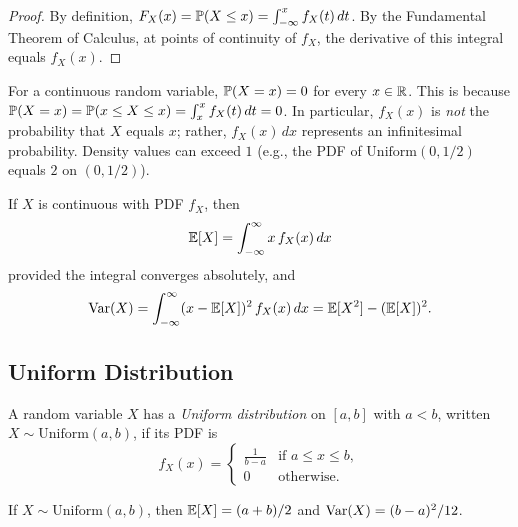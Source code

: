 \documentclass[11pt,a4paper]{article}
\begin{document}
\begin{proof}
By definition,
$F_X(x) = \mathbb{P}(X \leq x) = \int_{-\infty}^x f_X(t) \, dt$.
By the Fundamental Theorem of Calculus, at points of continuity of $f_X$,
the derivative of this integral equals $f_X(x)$.
\end{proof}

\begin{warning}[title={$\Prob(X = x) = 0$ for Continuous Random Variables}]
For a continuous random variable, $\Prob(X = x) = 0$ for every
$x \in \mathbb{R}$. This is because
$\mathbb{P}(X = x) = \mathbb{P}(x \leq X \leq x) = \int_x^x f_X(t)\,dt = 0$.
In particular, $f_X(x)$ is \emph{not} the probability that $X$ equals
$x$; rather, $f_X(x)\,dx$ represents an infinitesimal probability.
Density values can exceed $1$ (e.g., the PDF of
$\mathrm{Uniform}(0, 1/2)$ equals $2$ on $(0, 1/2)$).
\end{warning}

\begin{definition}
\label{def:continuous_expectation}
If $X$ is continuous with PDF $f_X$, then
\[
    \mathbb{E}[X] = \int_{-\infty}^{\infty} x \, f_X(x) \, dx
\]
provided the integral converges absolutely, and
\[
    \operatorname{Var}(X) = \int_{-\infty}^{\infty} (x - \mathbb{E}[X])^2 \, f_X(x) \, dx
    = \mathbb{E}[X^2] - (\mathbb{E}[X])^2.
\]
\end{definition}

\subsection{Uniform Distribution}

\begin{definition}
\label{def:uniform}
A random variable $X$ has a \emph{Uniform distribution} on $[a, b]$ with
$a < b$, written $X \sim \mathrm{Uniform}(a, b)$, if its PDF is
\[
    f_X(x) = \begin{cases}
        \frac{1}{b - a} & \text{if } a \leq x \leq b, \\
        0 & \text{otherwise}.
    \end{cases}
\]
\end{definition}

\begin{proposition}
\label{prop:uniform_moments}
If $X \sim \mathrm{Uniform}(a, b)$, then $\mathbb{E}[X] = (a + b)/2$ and
$\operatorname{Var}(X) = (b - a)^2/12$.
\end{proposition}
\end{document}

